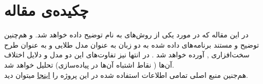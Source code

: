 \chapter*{
چکیده‌ی مقاله
}
\pagestyle{empty}

در این مقاله که در مورد یکی از روش‌های   به نام  توضیح داده خواهد شد. و هم‌چنین توضیح و مستند برنامه‌های داده شده به دو زبان  به عنوان مدل طلایی و  به عنوان طرح سخت‌افزاری , آورده خواهد شد .
در انتها نیز تفاوت‌های این دو مدل و دلایل اختلاف آن‌ها (‌ نقاط اشتباه آن‌ها در پیاده‌سازی) تحلیل خواهد شد.\\
هم‌جنین منبع اصلی تمامی اطلاعات استفاده شده در این پروژه را 
\href{http://www.skein-hash.info/sites/default/files/skein1.3.pdf}{اینجا} 
میتوان دید.